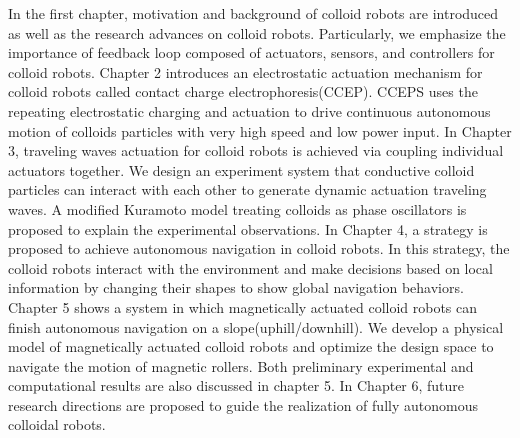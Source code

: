In the first chapter, motivation and background of colloid robots are introduced as well as the research advances on colloid robots. Particularly, we emphasize the importance of feedback loop composed of actuators, sensors, and controllers for colloid robots. Chapter 2 introduces an electrostatic actuation mechanism for colloid robots called contact charge electrophoresis(CCEP). CCEPS uses the repeating electrostatic charging and actuation to drive   
continuous autonomous motion of colloids particles with very high speed and low power input. In Chapter 3, traveling waves actuation for colloid robots is achieved via coupling individual actuators together.  We  design an experiment system that conductive  colloid particles can interact with each other to generate dynamic actuation traveling waves. A modified Kuramoto model treating colloids as phase oscillators is proposed to explain the experimental observations. In Chapter 4, a strategy is proposed to achieve autonomous navigation in colloid robots. In this strategy, the colloid robots interact with the environment and make decisions based on local information by changing their shapes to show global navigation behaviors.  Chapter 5  shows a system in which  magnetically actuated colloid robots can  finish autonomous navigation on a slope(uphill/downhill). We develop a physical model of  magnetically actuated colloid robots and optimize the design space to navigate the motion of magnetic rollers.  Both preliminary experimental and computational results are also discussed in chapter 5. In Chapter 6, future research directions  are proposed  to guide the realization of  fully autonomous colloidal robots. 

